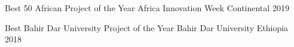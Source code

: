 \documentclass[13pt, a4paper]{awesome-cv}
\begin{document}
\begin{cvhonors}
  \cvhonor
    {Best 50 African Project of the Year} %
    {Africa Innovation Week} %
    {Continental} %
    {2019} %

  \cvhonor
    {Best Bahir Dar University Project of the Year} %
    {Bahir Dar University} %
    {Ethiopia} %
    {2018} %
\end{cvhonors}

\end{document}
